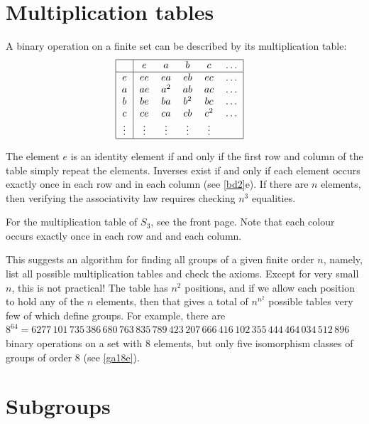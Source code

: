 \documentclass[a4paper,11pt,final]{memoir}%
\theoremstyle{nonumberplain}
\begin{document}
\section{Multiplication tables}

A binary operation on a finite set can be described by its multiplication
table:%
\[%
\begin{tabular}
[c]{|c|ccccc|}\hline
& $e$ & $a$ & $b$ & $c$ & $\ldots$\\\hline
$e$ & $ee$ & $ea$ & $eb$ & $ec$ & $\ldots$\\
$a$ & $ae$ & $a^{2}$ & $ab$ & $ac$ & $\ldots$\\
$b$ & $be$ & $ba$ & $b^{2}$ & $bc$ & $\ldots$\\
$c$ & $ce$ & $ca$ & $cb$ & $c^{2}$ & $\ldots$\\
$\vdots$ & $\vdots$ & $\vdots$ & $\vdots$ & $\vdots$ & \\\hline
\end{tabular}
\ \ \
\]


The element $e$ is an identity element if and only if the first row and column
of the table simply repeat the elements. Inverses exist if and only if each
element occurs exactly once in each row and in each column (see \ref{bd2}e).
If there are $n$ elements, then verifying the associativity law requires
checking $n^{3}$ equalities.

For the multiplication table of $S_{3}$, see the front page. Note that each
colour occurs exactly once in each row and and each column.

This suggests an algorithm for finding all groups of a given finite order $n$,
namely, list all possible multiplication tables and check the axioms. Except
for very small $n$, this is not practical! The table has $n^{2}$ positions,
and if we allow each position to hold any of the $n$ elements, then that gives
a total of $n^{n^{2}}$ possible tables very few of which define groups. For
example, there are $8^{64}=\allowbreak6277\,\allowbreak
101\,735\,386\,\allowbreak680\,763\,835\,\allowbreak789\,423\,207\,\allowbreak
666\,416\,102\,\allowbreak355\,444\,464\,\allowbreak034\,512\,896\allowbreak$
binary operations on a set with $8$ elements, but only five isomorphism
classes of groups of order $8$ (see \ref{ga18e}).

\section{Subgroups}
\end{document}
